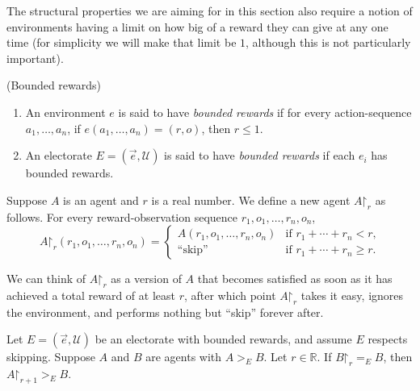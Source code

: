 \documentclass[twoside,11pt]{article}
\begin{document}
The structural properties we are aiming for in this section also require a notion
of environments having a limit on how big of a reward they can give at any one
time (for simplicity we will make that limit be $1$, although this is
not particularly important).

\begin{definition}
    (Bounded rewards)
    \begin{enumerate}
        \item
            An environment $e$ is said to have \emph{bounded rewards}
            if for every action-sequence $a_1,\ldots,a_n$,
            if $e(a_1,\ldots,a_n)=(r,o)$, then $r\leq 1$.
        \item
            An electorate $E=(\vec{e},\mathscr U)$ is said to have
            \emph{bounded rewards} if each $e_i$ has bounded rewards.
    \end{enumerate}
\end{definition}

\begin{definition}
Suppose $A$ is an agent and $r$ is a real number.
We define a new agent $A\mathord{\restriction}_r$ as follows.
For every reward-observation sequence $r_1,o_1,\ldots,r_n,o_n$,
\[
A\mathord{\restriction}_r(r_1,o_1,\ldots,r_n,o_n)
=
\begin{cases}
    A(r_1,o_1,\ldots,r_n,o_n) & \mbox{if $r_1+\cdots+r_n<r$,}\\
    \mbox{``skip''} & \mbox{if $r_1+\cdots+r_n\geq r$.}
\end{cases}
\]
\end{definition}

We can think of $A\mathord{\restriction}_r$ as a version
of $A$ that becomes satisfied as soon as it
has achieved a total reward of at least $r$, after which
point $A\mathord{\restriction}_r$ takes it easy, ignores the environment,
and performs nothing but ``skip'' forever after.

\begin{proposition}
\label{quitterproposition}
Let $E=(\vec{e},\mathscr U)$ be an electorate with bounded rewards, and assume
$E$ respects skipping.
Suppose $A$ and $B$ are agents with $A>_{E}B$. Let $r\in\mathbb R$.
If $B\mathord{\restriction}_r=_{E}B$, then $A\mathord{\restriction}_{r+1}>_{E}B$.
\end{proposition}
\end{document}

